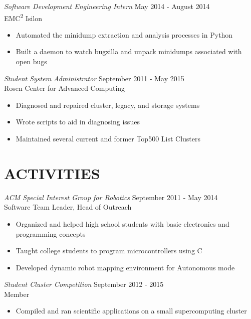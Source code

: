 \documentclass[line,margin]{res}
\begin{document}
\begin{resume}
    {\sl Software Development Engineering Intern} \hfill May 2014 - August 2014 \\
      EMC\textsuperscript{2} Isilon
      \begin{itemize}  \itemsep -2pt
        \item Automated the minidump extraction and analysis processes in Python
        \item Built a daemon to watch bugzilla and unpack minidumps associated with open bugs
      \end{itemize}

    {\sl Student System Administrator} \hfill September 2011 - May 2015 \\
      Rosen Center for Advanced Computing
      \begin{itemize}  \itemsep -2pt %
        \item Diagnosed and repaired cluster, legacy, and storage systems
        \item Wrote scripts to aid in diagnosing issues
        \item Maintained several current and former Top500 List Clusters
      \end{itemize}

  \section{\textcolor{TealBlue}{ACTIVITIES}}
    {\sl ACM Special Interest Group for Robotics} \hfill September 2011 - May 2014 \\
      Software Team Leader, Head of Outreach
      \begin{itemize}  \itemsep -2pt %
        \item Organized and helped high school students with basic electronics and programming concepts
        \item Taught college students to program microcontrollers using C
        \item Developed dynamic robot mapping environment for Autonomous mode
      \end{itemize}
    
    {\sl Student Cluster Competition} \hfill September 2012 - 2015 \\
      Member
      \begin{itemize}  \itemsep -2pt %
        \item Compiled and ran scientific applications on a small supercomputing cluster
      \end{itemize}
  

\end{resume}
\end{document}

